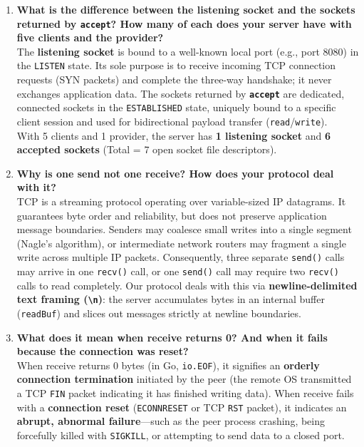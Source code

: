 \documentclass{labreport}
\begin{document}
\begin{enumerate}
    \item \textbf{What is the difference between the listening socket and the sockets returned by \texttt{accept}? How many of each does your server have with five clients and the provider?}\\
    The \textbf{listening socket} is bound to a well-known local port (e.g., port 8080) in the \texttt{LISTEN} state. Its sole purpose is to receive incoming TCP connection requests (SYN packets) and complete the three-way handshake; it never exchanges application data. The sockets returned by \textbf{\texttt{accept}} are dedicated, connected sockets in the \texttt{ESTABLISHED} state, uniquely bound to a specific client session and used for bidirectional payload transfer (\texttt{read}/\texttt{write}).\\
    With 5 clients and 1 provider, the server has \textbf{1 listening socket} and \textbf{6 accepted sockets} (Total = 7 open socket file descriptors).

    \item \textbf{Why is one send not one receive? How does your protocol deal with it?}\\
    TCP is a streaming protocol operating over variable-sized IP datagrams. It guarantees byte order and reliability, but does not preserve application message boundaries. Senders may coalesce small writes into a single segment (Nagle's algorithm), or intermediate network routers may fragment a single write across multiple IP packets. Consequently, three separate \texttt{send()} calls may arrive in one \texttt{recv()} call, or one \texttt{send()} call may require two \texttt{recv()} calls to read completely. Our protocol deals with this via \textbf{newline-delimited text framing (\texttt{\textbackslash n})}: the server accumulates bytes in an internal buffer (\texttt{readBuf}) and slices out messages strictly at newline boundaries.

    \item \textbf{What does it mean when receive returns 0? And when it fails because the connection was reset?}\\
    When receive returns 0 bytes (in Go, \texttt{io.EOF}), it signifies an \textbf{orderly connection termination} initiated by the peer (the remote OS transmitted a TCP \texttt{FIN} packet indicating it has finished writing data). When receive fails with a \textbf{connection reset} (\texttt{ECONNRESET} or TCP \texttt{RST} packet), it indicates an \textbf{abrupt, abnormal failure}---such as the peer process crashing, being forcefully killed with \texttt{SIGKILL}, or attempting to send data to a closed port.


\end{enumerate}
\end{document}
